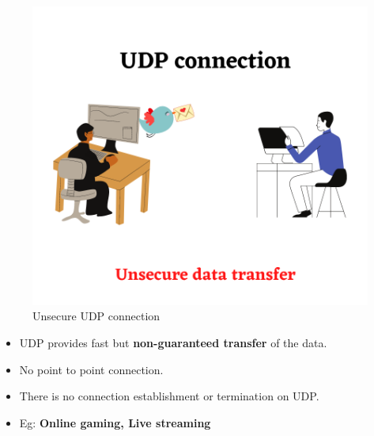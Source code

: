 \begin{flushleft}
	\newpage
	\begin{figure}[h!]
		\centering
		\includegraphics[scale=0.6]{content/chapter14/images/udp.png}
		\caption{Unsecure UDP connection}
		\label{fig:udp}
	\end{figure}
	
	\begin{itemize}
		\item UDP provides fast but \textbf{non-guaranteed transfer} of the data.
		\item No point to point connection.
		\item There is no connection establishment or termination on UDP.
		\item Eg: \textbf{Online gaming, Live streaming}

		
	\end{itemize}
	
	
	
	
	
\end{flushleft}
\newpage


